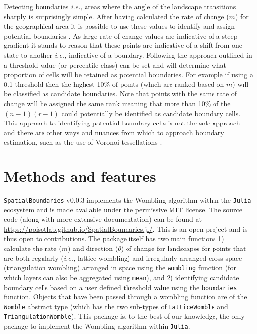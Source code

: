 Detecting boundaries \emph{i.e.,} areas where the angle of the landscape
transitions sharply is surprisingly simple. After having calculated the
rate of change (\(m\)) for the geographical area it is possible to use
these values to identify and assign potential boundaries
\cite{Fortin2005SpaAna, Oden1993CatWom, Fortin1995DelEco}. As large
rate of change values are indicative of a steep gradient it stands to
reason that these points are indicative of a shift from one state to
another \emph{i.e.,} indicative of a boundary. Following the approach
outlined in \cite{Fortin2005SpaAna} a threshold value (or percentile class)
can be set and will determine what proportion of cells will be retained
as potential boundaries. For example if using a 0.1 threshold then the
highest 10\% of points (which are ranked based on \(m\)) will be
classified as candidate boundaries. Note that points with the same rate
of change will be assigned the same rank meaning that more than 10\% of
the \((n -1)(r - 1)\) could potentially be identified as candidate
boundary cells. This approach to identifying potential boundary cells is
not the sole approach and there are other ways and nuances from which to
approach boundary estimation, such as the use of Voronoi tessellations
\cite{Fortin1995DelEco, Oden1993CatWom, Matchev2020FinWom}.

\section{Methods and features}\label{methods-and-features}

\texttt{SpatialBoundaries} v0.0.3 implements the Wombling algorithm
within the \texttt{Julia} ecosystem and is made available under the
permissive MIT license. The source code (along with more extensive
documentation) can be found at
\url{https://poisotlab.github.io/SpatialBoundaries.jl/}. This is an open
project and is thus open to contributions. The package itself has two
main functions 1) calculate the rate (\(m\)) and direction (\(\theta\))
of change for landscapes for points that are both regularly (\emph{i.e.,}
lattice wombling) and irregularly arranged cross space (triangulation
wombling) arranged in space using the \texttt{wombling} function (for
which layers can also be aggregated using \texttt{mean}), and 2)
identifying candidate boundary cells based on a user defined threshold
value using the \texttt{boundaries} function. Objects that have been
passed through a wombling function are of the \texttt{Womble} abstract
type (which has the two sub-types of \texttt{LatticeWomble} and
\texttt{TriangulationWomble}). This package is, to the best of our
knowledge, the only package to implement the Wombling algorithm within
\texttt{Julia}.


